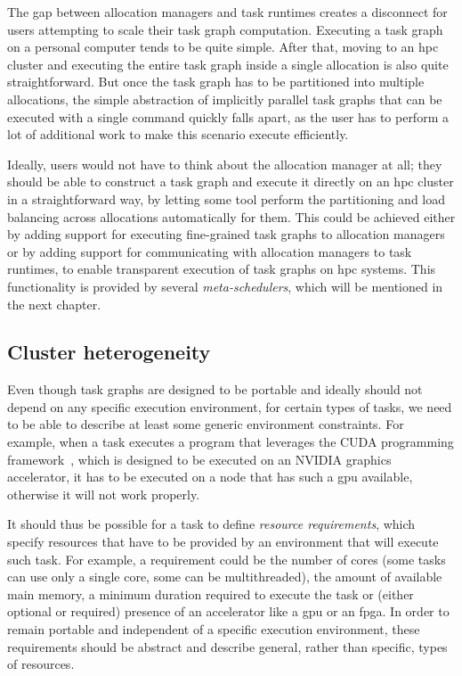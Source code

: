 \vspace{5mm}
The gap between allocation managers and task runtimes creates a disconnect for users attempting to
scale their task graph computation. Executing a task graph on a personal computer tends to be quite
simple. After that, moving to an \gls{hpc} cluster and executing the entire task
graph inside a single allocation is also quite straightforward. But once the task graph has to be
partitioned into multiple allocations, the simple abstraction of implicitly parallel task graphs
that can be executed with a single command quickly falls apart, as the user has to perform a lot of
additional work to make this scenario execute efficiently.

Ideally, users would not have to think about the allocation manager at all; they should be able to
construct a task graph and execute it directly on an \gls{hpc} cluster in a
straightforward way, by letting some tool perform the partitioning and load balancing across
allocations automatically for them. This could be achieved either by adding support for executing
fine-grained task graphs to allocation managers or by adding support for communicating with
allocation managers to task runtimes, to enable transparent execution of task graphs on
\gls{hpc} systems. This functionality is provided by several
\emph{meta-schedulers}, which will be mentioned in the next chapter.

\subsection{Cluster heterogeneity}
Even though task graphs are designed to be portable and ideally should not depend on any specific
execution environment, for certain types of tasks, we need to be able to describe at least some
generic environment constraints. For example, when a task executes a program that leverages the
CUDA programming framework~\cite{cuda}, which is designed to be executed on an
NVIDIA graphics accelerator, it has to be executed on a node that has such a
\gls{gpu} available, otherwise it will not work properly.

It should thus be possible for a task to define \emph{resource requirements}, which specify
resources that have to be provided by an environment that will execute such task. For example, a
requirement could be the number of cores (some tasks can use only a single core, some can be
multithreaded), the amount of available main memory, a minimum duration required to execute the
task or (either optional or required) presence of an accelerator like a \gls{gpu}
or an \gls{fpga}. In order to remain portable and independent of a specific
execution environment, these requirements should be abstract and describe general, rather than
specific, types of resources.

